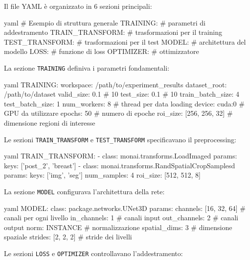 Il file YAML è organizzato in 6 sezioni principali:

\begin{code}{yaml}
# Esempio di struttura generale
TRAINING:
  # parametri di addestramento
TRAIN_TRANSFORM:
  # trasformazioni per il training
TEST_TRANSFORM:
  # trasformazioni per il test
MODEL:
  # architettura del modello
LOSS:
  # funzione di loss
OPTIMIZER:
  # ottimizzatore
\end{code}

La sezione \texttt{TRAINING} definiva i parametri fondamentali:

\begin{code}{yaml}
TRAINING:
  workspace: /path/to/experiment_results
  dataset_root: /path/to/dataset
  valid_size: 0.1  # 10%
  test_size: 0.1   # 10%
  train_batch_size: 4
  test_batch_size: 1 
  num_workers: 8    # thread per data loading
  device: cuda:0    # GPU da utilizzare
  epochs: 50        # numero di epoche
  roi_size: [256, 256, 32]  # dimensione regioni di interesse
\end{code}


Le sezioni \texttt{TRAIN\_TRANSFORM} e \texttt{TEST\_TRANSFORM} specificavano il preprocessing:

\begin{code}{yaml}
TRAIN_TRANSFORM:
  - class: monai.transforms.LoadImaged
    params:
      keys: ['post_2', 'breast']
  - class: monai.transforms.RandSpatialCropSamplesd
    params:
      keys: ['img', 'seg']
      num_samples: 4
      roi_size: [512, 512, 8]
\end{code}


La sezione \texttt{MODEL} configurava l'architettura della rete:

\begin{code}{yaml}
MODEL:
  class: package.networks.UNet3D
  params:
    channels: [16, 32, 64]  # canali per ogni livello
    in_channels: 1          # canali input
    out_channels: 2         # canali output
    norm: INSTANCE          # normalizzazione
    spatial_dims: 3         # dimensione spaziale
    strides: [2, 2, 2]      # stride dei livelli
\end{code}


Le sezioni \texttt{LOSS} e \texttt{OPTIMIZER} controllavano l'addestramento:


